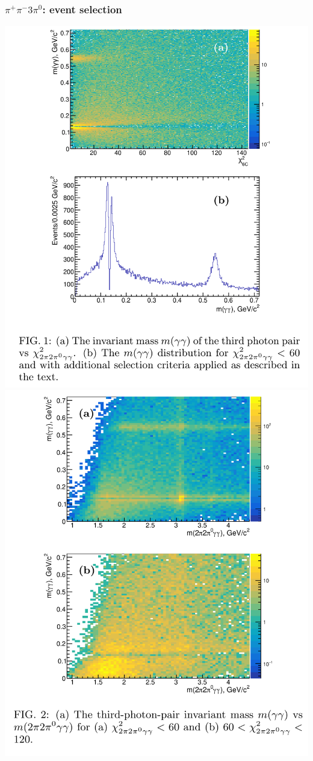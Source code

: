 \documentclass[10pt, aspectratio=169]{beamer}
\def\pip{\pi^+}
\def\pim{\pi^-}
\def\piz{\pi^0}
\begin{document}
\begin{frame}[label=3pi-selection]%
  \frametitle{$\pip\pim3\piz$: event selection}
  \centering

  \includegraphics[height=.8\textheight]{figures/003/fig001}
  \hspace{5ex}
  \includegraphics[height=.8\textheight]{figures/003/fig002}
\end{frame}%
\end{document}
